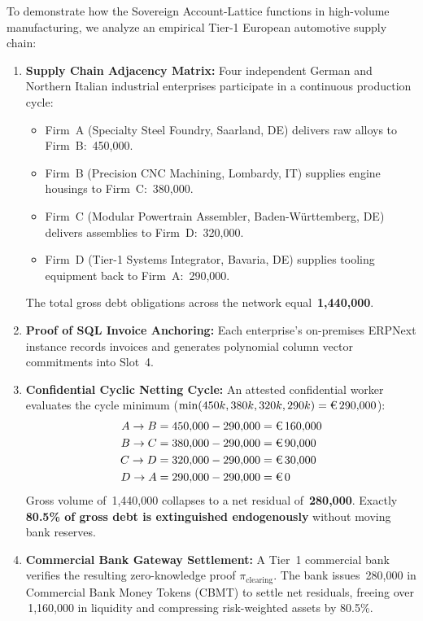 \documentclass[a4paper,11pt,twoside,parskip=half-,headings=small]{scrartcl}
\newcommand{\EUR}[1]{\texteuro\,#1}
\begin{document}
To demonstrate how the Sovereign Account-Lattice functions in high-volume manufacturing,
we analyze an empirical Tier-1 European automotive supply chain:
\begin{enumerate}
  \item \textbf{Supply Chain Adjacency Matrix:} Four independent German and Northern Italian
industrial enterprises participate in a continuous production cycle:
\begin{itemize}
\item Firm~A (Specialty Steel Foundry, Saarland, DE) delivers raw alloys to Firm~B: \EUR{450,000}.
\item Firm~B (Precision CNC Machining, Lombardy, IT) supplies engine housings to Firm~C: \EUR{380,000}.
\item Firm~C (Modular Powertrain Assembler, Baden-Württemberg, DE) delivers assemblies to Firm~D: \EUR{320,000}.
\item Firm~D (Tier-1 Systems Integrator, Bavaria, DE) supplies tooling equipment back to Firm~A: \EUR{290,000}.
\end{itemize}
The total gross debt obligations across the network equal \textbf{\EUR{1,440,000}}.
  \item \textbf{Proof of SQL Invoice Anchoring:} Each enterprise's on-premises ERPNext instance
records invoices and generates polynomial column vector commitments into Slot~4.
  \item \textbf{Confidential Cyclic Netting Cycle:} An attested confidential worker evaluates
the cycle minimum ($\min(450k, 380k, 320k, 290k) = \text{\EUR{290,000}}$):
\begin{align*}
A \to B &= 450{,}000 - 290{,}000 = \text{\EUR{160,000}} \\
B \to C &= 380{,}000 - 290{,}000 = \text{\EUR{90,000}} \\
C \to D &= 320{,}000 - 290{,}000 = \text{\EUR{30,000}} \\
D \to A &= 290{,}000 - 290{,}000 = \text{\EUR{0}}
\end{align*}
Gross volume of \EUR{1,440,000} collapses to a net residual of \textbf{\EUR{280,000}}.
Exactly \textbf{80.5\% of gross debt is extinguished endogenously} without moving bank reserves.
  \item \textbf{Commercial Bank Gateway Settlement:} A Tier~1 commercial bank verifies the
resulting zero-knowledge proof $\pi_{\text{clearing}}$. The bank issues \EUR{280,000}
in Commercial Bank Money Tokens (CBMT) to settle net residuals, freeing over
\EUR{1,160,000} in liquidity and compressing risk-weighted assets by 80.5\%.
\end{enumerate}
\end{document}
